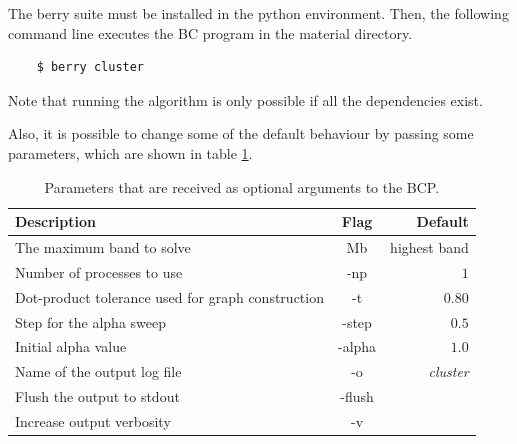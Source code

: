 \documentclass[a4paper,12pt]{report}
\begin{document}
\begin{appendices}
\begin{table}[H]
\begin{tabular}{lr}
        \hline
    \end{tabular}
\end{table}

The berry suite must be installed in the python environment. Then, the following command line executes the BC program in the material directory.

\begin{verbatim}
    $ berry cluster
\end{verbatim}

Note that running the algorithm is only possible if all the dependencies exist.

Also, it is possible to change some of the default behaviour by passing some parameters, which are shown in table \ref{tab:options}.

\begin{table}[H]
    \center
    \caption{Parameters that are received as optional arguments to the BCP.}\label{tab:options}
    \begin{tabular}{lcr}
        \hline
        Description & Flag & Default \\
        \hline
        The maximum band to solve  & Mb & highest band\\
        Number of processes to use & -np & $1$\\
        Dot-product tolerance used for graph construction & -t & $0.80$\\
        Step for the alpha sweep & -step & $0.5$\\
        Initial alpha value & -alpha & $1.0$\\
        Name of the output log file & -o & \textit{cluster}\\
        Flush the output to stdout & -flush & \\
        Increase output verbosity & -v & \\

        \hline
    \end{tabular}
\end{table}



\end{appendices}
\end{document}
